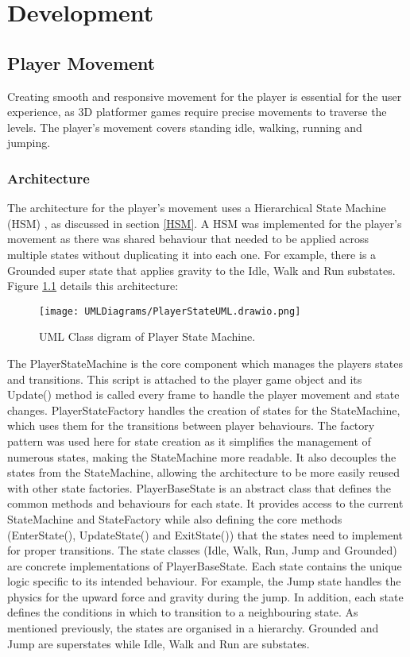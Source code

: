 \documentclass[10pt]{final_report}
\begin{document}
\chapter{Development}
\section{Player Movement}
Creating smooth and responsive movement for the player is essential for the user experience, as 3D platformer games require precise movements to traverse the levels. The player's movement covers standing idle, walking, running and jumping. 
\subsection{Architecture}
The architecture for the player's movement uses a Hierarchical State Machine (HSM) , as discussed in section \ref{HSM}.  A HSM was implemented for the player's movement as there was shared behaviour that needed to be applied across multiple states without duplicating it into each one. For example, there is a Grounded super state that applies gravity to the Idle, Walk and Run substates. Figure \ref{fig:label_State} details this architecture:

\begin{figure}[h!]
    \centering
    \texttt{[image: UMLDiagrams/PlayerStateUML.drawio.png]}
    \caption{UML Class digram of Player State Machine.}
    \label{fig:label_State}
\end{figure}

The PlayerStateMachine is the core component which manages the players states and transitions. This script is attached to the player game object and its Update() method is called every frame to handle the player movement and state changes. PlayerStateFactory handles the creation of states for the StateMachine, which uses them for the transitions between player behaviours. The factory pattern was used here for state creation as it simplifies the management of numerous states, making the StateMachine more readable. It also decouples the states from the StateMachine, allowing the architecture to be more easily reused with other state factories. PlayerBaseState is an abstract class that defines the common methods and behaviours for each state.  It provides access to the current StateMachine and StateFactory while also defining the core methods (EnterState(), UpdateState() and ExitState()) that the states need to implement for proper transitions. The state classes (Idle, Walk, Run, Jump and Grounded) are concrete implementations of PlayerBaseState. Each state contains the unique logic specific to its intended behaviour. For example, the Jump state handles the physics for the upward force and gravity during the jump. In addition, each state defines the conditions in which to transition to a neighbouring state. As mentioned previously, the states are organised in a hierarchy. Grounded and Jump are superstates while Idle, Walk and Run are substates. 
\end{document}

